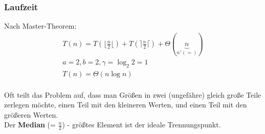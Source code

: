 \subsubsection{Laufzeit}
Nach Master-Theorem:
\begin{align*}
T(n) = T (\lfloor \frac{n}{2} \lfloor) + T(\rceil \frac{n}{2} \lceil) + \Theta(\underbrace{n}_{n^\gamma (=)})\\
a = 2, b= 2, \gamma = \log_2 2 = 1\\
T(n) = \Theta (n \log n)\\
\end{align*}

Oft teilt das Problem auf, dass man Größen in zwei (ungefähre) gleich große Teile zerlegen möchte, einen Teil mit den kleineren Werten, und einen Teil mit den größeren Werten. \\
Der \textbf{Median} (= $\frac{n}{2}$) - größtes Element ist der ideale Trennungspunkt.
